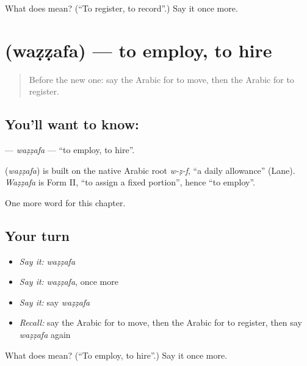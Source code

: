 \begin{tcolorbox}[breakable,colback=teal!4,colframe=teal!35!black,title={Before you move on}]
What does  mean? (\textquotedblleft{}To register, to record\textquotedblright{}.) Say it once more.
\end{tcolorbox}
\section[\texorpdfstring{\ar{وظف} (waẓẓafa)}{وظف (waẓẓafa)}]{ (waẓẓafa) — to employ, to hire}

\label{lesson:AR-C162-wazzafa}



\begin{quote}
Before the new one: say the Arabic for to move, then the Arabic for to register.
\end{quote}

\subsection*{You'll want to know: }
\textbf{} — \emph{waẓẓafa} — \textquotedblleft{}to employ, to hire\textquotedblright{}.

\begin{cousinweb}
\textbf{} (\emph{waẓẓafa}) is built on the native Arabic root \emph{w-ẓ-f}, \textquotedblleft{}a daily allowance\textquotedblright{} (Lane). \emph{Waẓẓafa} is Form II, \textquotedblleft{}to assign a fixed portion\textquotedblright{}, hence \textquotedblleft{}to employ\textquotedblright{}.
\end{cousinweb}

\begin{grammarlens}[title={What you've built}]
One more word for this chapter.
\end{grammarlens}

\subsection*{Your turn}
\begin{itemize}
\raggedright
  \item \emph{Say it:} \emph{waẓẓafa}
  \item \emph{Say it:} \emph{waẓẓafa}, once more
  \item \emph{Say it:} say \emph{waẓẓafa}
  \item \emph{Recall:} say the Arabic for to move, then the Arabic for to register, then say \emph{waẓẓafa} again
\end{itemize}

\begin{tcolorbox}[breakable,colback=teal!4,colframe=teal!35!black,title={Before you move on}]
What does  mean? (\textquotedblleft{}To employ, to hire\textquotedblright{}.) Say it once more.
\end{tcolorbox}
